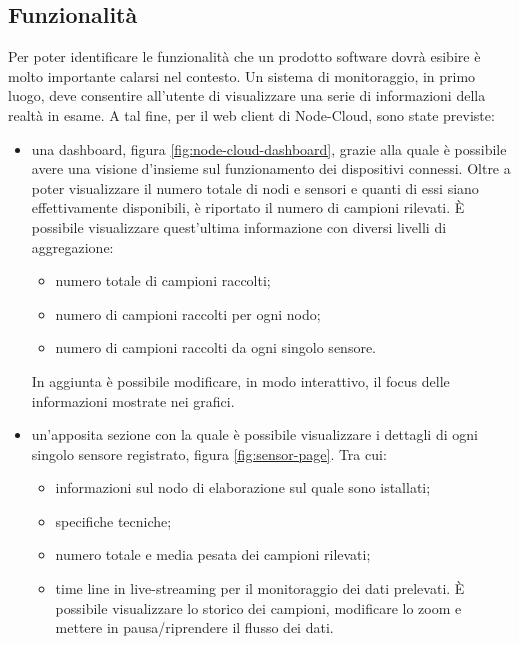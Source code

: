 \documentclass{article}
\begin{document}
\subsection{Funzionalità}
Per poter identificare le funzionalità che un prodotto software dovrà esibire è molto importante calarsi nel contesto. Un sistema di monitoraggio, in primo luogo, deve consentire all’utente di visualizzare una serie di informazioni della realtà in esame. A tal fine, per il web client di Node-Cloud, sono state previste:
\begin{itemize}
    \item una dashboard, figura \ref{fig:node-cloud-dashboard}, grazie alla quale è possibile avere una visione d’insieme sul funzionamento dei dispositivi connessi. Oltre a poter visualizzare il numero totale di nodi e sensori e quanti di essi siano effettivamente disponibili, è riportato il numero di campioni rilevati. È possibile visualizzare quest’ultima informazione con diversi livelli di aggregazione:
    \begin{itemize}
        \item numero totale di campioni raccolti;
        \item numero di campioni raccolti per ogni nodo;
        \item numero di campioni raccolti da ogni singolo sensore.
    \end{itemize}
    In aggiunta è possibile modificare, in modo interattivo, il focus delle informazioni mostrate nei grafici.
    \item un’apposita sezione con la quale è possibile visualizzare i dettagli di ogni singolo sensore registrato, figura \ref{fig:sensor-page}. Tra cui:
    \begin{itemize}
        \item informazioni sul nodo di elaborazione sul quale sono istallati;
        \item specifiche tecniche;
        \item numero totale e media pesata dei campioni rilevati;
        \item time line in live-streaming per il monitoraggio dei dati prelevati. È possibile visualizzare lo storico dei campioni, modificare lo zoom e mettere in pausa/riprendere il flusso dei dati.
    \end{itemize}
\end{itemize}
\end{document}
